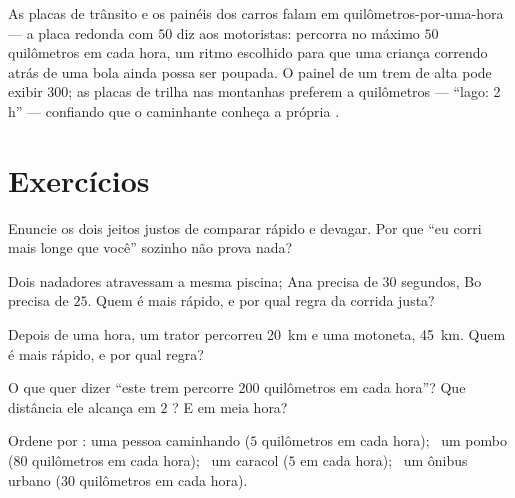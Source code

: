 \begin{example}\label{ex:g5:speed-distance-time:signs}
As placas de trânsito e os painéis dos carros falam em
quilômetros-por-uma-hora --- a placa redonda com $50$ diz aos
motoristas: percorra no máximo $50$ quilômetros em cada hora, um
ritmo escolhido para que uma criança correndo atrás de uma bola ainda
possa ser poupada. O painel de um trem de alta  pode exibir
$300$; as placas de trilha nas montanhas preferem  a
quilômetros --- ``lago: 2 h'' --- confiando que o caminhante conheça
a própria .
\end{example}

\section{Exercícios}

\begin{exercise}[$\star$]\label{exo:g5:speed-distance-time:1}
Enuncie os dois jeitos justos de comparar rápido e devagar. Por que
``eu corri mais longe que você'' sozinho não prova nada?
\end{exercise}

\begin{exercise}[$\star$]\label{exo:g5:speed-distance-time:2}
Dois nadadores atravessam a mesma piscina; Ana precisa de $30$
segundos, Bo precisa de $25$. Quem é mais rápido, e por qual regra da
corrida justa?
\end{exercise}

\begin{exercise}[$\star$]\label{exo:g5:speed-distance-time:3}
Depois de uma hora, um trator percorreu \qty{20}{km} e uma
motoneta, \qty{45}{km}. Quem é mais rápido, e por qual regra?
\end{exercise}

\begin{exercise}[$\star$]\label{exo:g5:speed-distance-time:4}
O que quer dizer ``este trem percorre $200$ quilômetros em cada
hora''? Que distância ele alcança em $2$ ? E em meia hora?
\end{exercise}

\begin{exercise}[$\star$]\label{exo:g5:speed-distance-time:5}
Ordene por : uma pessoa caminhando ($5$
quilômetros em cada hora); \ um pombo ($80$ quilômetros em cada
hora); \ um caracol ($5$ \emph{} em cada hora); \ um ônibus
urbano ($30$ quilômetros em cada hora).
\end{exercise}

